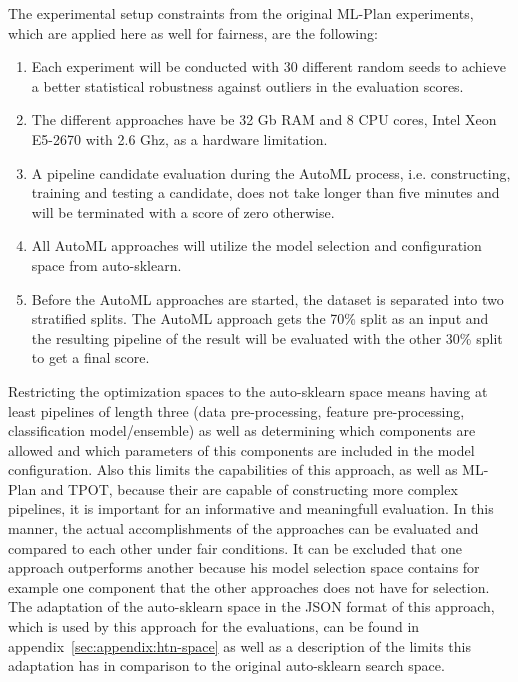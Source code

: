 The experimental setup constraints from the original ML-Plan experiments, which are applied here as well for fairness, are the following:
\begin{enumerate}
    \item Each experiment will be conducted with 30 different random seeds to achieve a better statistical robustness against outliers in the evaluation scores.
    \item The different approaches have be 32 Gb RAM and 8 CPU cores, Intel Xeon E5-2670 with 2.6 Ghz, as a hardware limitation.
    \item A pipeline candidate evaluation during the AutoML process, i.e. constructing, training and testing a candidate, does not take longer than five minutes and will be terminated with a score of zero otherwise.
    \item All AutoML approaches will utilize the model selection and configuration space from auto-sklearn.
    \item Before the AutoML approaches are started, the dataset is separated into two stratified splits. The AutoML approach gets the 70\% split as an input and the resulting pipeline of the result will be evaluated with the other 30\% split to get a final score.
\end{enumerate}
Restricting the optimization spaces to the auto-sklearn space means having at least pipelines of length three (data pre-processing, feature pre-processing, classification model/ensemble) as well as determining which components are allowed and which parameters of this components are included in the model configuration.
Also this limits the capabilities of this approach, as well as ML-Plan and TPOT, because their are capable of constructing more complex pipelines, it is important for an informative and meaningfull evaluation.
In this manner, the actual accomplishments of the approaches can be evaluated and compared to each other under fair conditions.
It can be excluded that one approach outperforms another because his model selection space contains for example one component that the other approaches does not have for selection.\newline
The adaptation of the auto-sklearn space in the JSON format of this approach, which is used by this approach for the evaluations, can be found in appendix~\ref{sec:appendix:htn-space} as well as a description of the limits this adaptation has in comparison to the original auto-sklearn search space.

